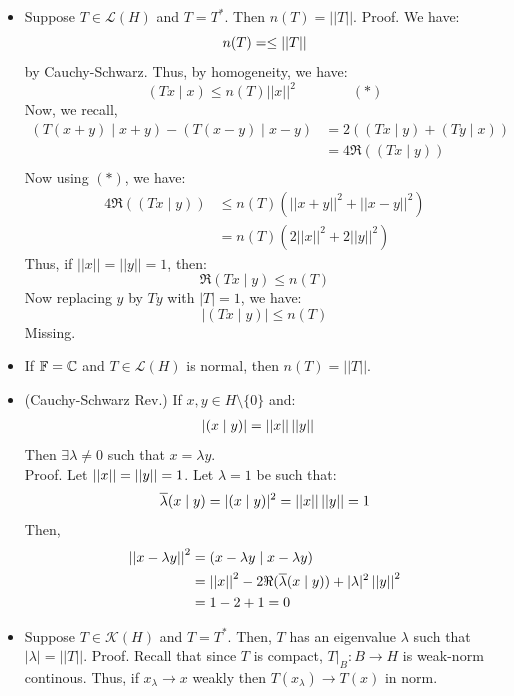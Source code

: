 \documentclass[12pt]{article}
\begin{document}
\begin{itemize}
\begin{align*}
    \end{align*}
    Thus, $n(T) = ||A||^2$. Thus, $n(T) = \norm{A^*A} = \norm{T}$.
    \item[Prop.] Suppose $T \in \mathcal{L}(H)$ and $T = T^*$. Then $n(T) = ||T||$. \bbni
    Proof. We have: 
    \[ n(T) = \leq \left\vert\left\vert T\right\vert\right\vert\]
    by Cauchy-Schwarz. Thus, by homogeneity, we have:
    \[ (Tx \mid x) \leq n(T)||x||^2 \qquad \qquad (*)\]
    Now, we recall, 
    \begin{align*}
        (T(x+y) \mid x+y) - (T(x-y) \mid x-y) &= 2((Tx \mid y) + (Ty \mid x)) \\
        &= 4\Re((Tx \mid y)) \\
    \end{align*}
    Now using $(*)$, we have:
    \begin{align*}
        4\Re((Tx \mid y)) &\leq n(T)(||x+y||^2 + ||x-y||^2) \\
        &= n(T)(2||x||^2 + 2||y||^2)
    \end{align*}
    Thus, if $||x|| = ||y|| = 1$, then:
    \[ \Re(Tx \mid y) \leq n(T)\]
    Now replacing $y$ by $Ty$ with $|T| = 1$, we have:
    \[ |(Tx \mid y)| \leq n(T) \]
    Missing. 
    \item[Rmk.] If $\mathbb F = \mathbb C$ and $T \in \mathcal{L}(H)$ is normal, then $n(T) = ||T||$. 
    \item[Lem.] (Cauchy-Schwarz Rev.) If $x, y \in H \setminus \{0\}$ and: 
    \begin{align*}
        |(x \mid y)| &= \left\vert\left\vert x\right\vert\right\vert\left\vert\left\vert y\right\vert\right\vert 
    \end{align*} 
    Then $\exists \lambda \neq 0$ such that $x = \lambda y$. \\
    Proof. Let $\left\vert\left\vert x\right\vert\right\vert = \left\vert\left\vert y\right\vert\right\vert = 1$. Let $\lambda = 1$ be such that:
    \[ \overline{\lambda}(x \mid y) = |(x \mid y)|^2 = \left\vert\left\vert x\right\vert\right\vert\left\vert\left\vert y\right\vert\right\vert = 1\]
    Then, 
    \begin{align*}
        \left\vert\left\vert x-\lambda y\right\vert\right\vert^2 &= (x - \lambda y \mid x - \lambda y) \\
        &= \left\vert\left\vert x\right\vert\right\vert^2 -2 \Re(\overline{\lambda}(x \mid y)) + |\lambda|^2 \left\vert\left\vert y\right\vert\right\vert^2 \\
        &= 1 - 2  + 1 = 0
    \end{align*}
    \item[Prop.] Suppose $T \in \mathcal{K}(H)$ and $T = T^*$. Then, $T$ has an eigenvalue $\lambda$ such that $|\lambda| = ||T||$. \bbni
    Proof. Recall that since $T$ is compact, $T|_B: B \to H$ is weak-norm continous. Thus, if $x_\lambda \to x$ weakly then $T(x_\lambda) \to T(x)$ in norm.  \\

\end{itemize}
\end{document}
